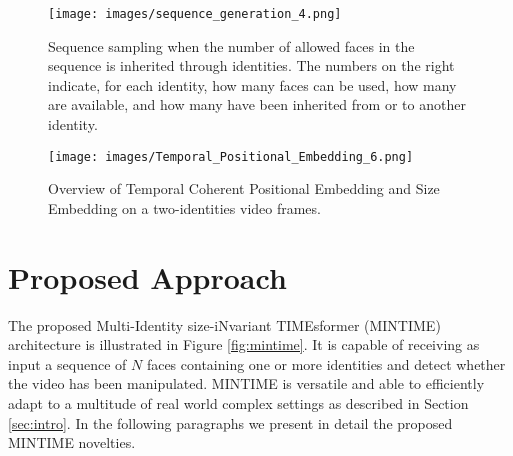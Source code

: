 \documentclass[10pt,twocolumn,letterpaper]{article}
\begin{document}
\begin{figure}[t]
  \centering
   \texttt{[image: images/sequence\_generation\_4.png]}
   \caption{Sequence sampling when the number of allowed faces in the sequence is inherited through identities. The numbers on the right indicate, for each identity, how many faces can be used, how many are available, and how many have been inherited from or to another identity.}
    \label{figure:sequence_generation}
\end{figure}
\begin{figure*}[t]
    \centering
    \texttt{[image: images/Temporal\_Positional\_Embedding\_6.png]}
    \caption{Overview of Temporal Coherent Positional Embedding and Size Embedding on a two-identities video frames.}
    \label{fig:embeddings}
\end{figure*}


\section{Proposed Approach}
The proposed Multi-Identity size-iNvariant TIMEsformer (MINTIME) architecture is illustrated in Figure \ref{fig:mintime}. It is capable of receiving as input a sequence of $N$ faces containing one or more identities and detect whether the video has been manipulated. MINTIME is versatile and able to efficiently adapt to a multitude of real world complex settings as described in Section \ref{sec:intro}.
In the following paragraphs we present in detail the proposed MINTIME novelties. 
\end{document}
